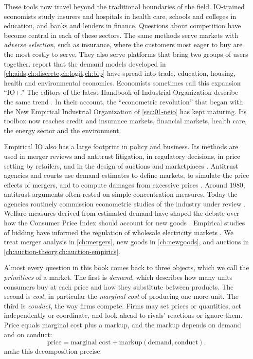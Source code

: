 These tools now travel beyond the traditional boundaries of the field. IO-trained economists study insurers
and hospitals in health care, schools and colleges in education, and banks and lenders in finance. Questions
about competition have become central in each of these sectors. The same methods serve markets with \emph{adverse
selection}, such as insurance, where the customers most eager to buy are the most costly to serve. They also
serve platforms that bring two groups of users together. \citet[p.~149]{EinavLevin2010}
report that the demand models developed in \cref{ch:aids,ch:discrete,ch:logit,ch:blp} have spread into trade,
education, housing, health and environmental economics. Economists sometimes call this expansion ``IO+.'' The
editors of the latest Handbook of Industrial Organization describe the same trend \citep[Preface, p.~xv]{HoHortacsuLizzeri2021}.
In their account, the ``econometric revolution'' that began with the New Empirical Industrial Organization of
\cref{sec:01-neio} has kept maturing. Its toolbox now reaches credit and insurance markets, financial markets, health
care, the energy sector and the environment.

Empirical IO also has a large footprint in policy and business. Its methods are used in merger reviews and
antitrust litigation, in regulatory decisions, in price setting by retailers, and in the design of auctions and
marketplaces \citep[p.~145]{EinavLevin2010}. Antitrust agencies and courts use demand estimates to define
markets, to simulate the price effects of mergers, and to compute damages from excessive prices
\citep[p.~149]{EinavLevin2010}. Around 1980, antitrust arguments often rested on simple concentration measures.
Today the agencies routinely commission econometric studies of the industry under review
\citep[p.~152]{EinavLevin2010}. Welfare measures derived from estimated demand have shaped the debate over how
the Consumer Price Index should account for new goods \citep[p.~149]{EinavLevin2010}. Empirical studies of
bidding have informed the regulation of wholesale electricity markets \citep[p.~154]{EinavLevin2010}. We treat
merger analysis in \cref{ch:mergers}, new goods in \cref{ch:newgoods}, and auctions in
\cref{ch:auction-theory,ch:auction-empirics}.

Almost every question in this book comes back to three objects, which we call the \emph{primitives} of a
market. The first is \emph{demand}, which describes how many units consumers buy at each price and how they
substitute between products. The second is \emph{cost}, in particular the \emph{marginal cost} of producing one
more unit. The third is \emph{conduct}, the way firms compete. Firms may set prices or quantities, act
independently or coordinate, and look ahead to rivals' reactions or ignore them. Price equals marginal cost
plus a markup, and the markup depends on demand and on conduct:
\begin{equation}\label{eq:01-price-decomposition}
  \text{price} = \text{marginal cost} + \text{markup}(\text{demand}, \text{conduct}).
\end{equation}
 make this decomposition precise.

